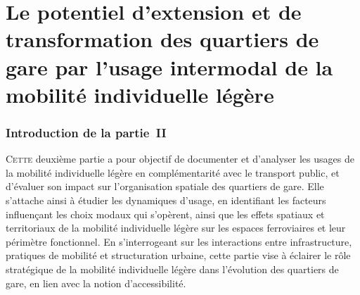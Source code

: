 \part{Le potentiel d’extension et de transformation des quartiers de gare par l'usage intermodal de la mobilité individuelle légère
    \label{part2:titre}
    }

\cleardoublepage
\section*{Introduction de la partie~II
    \label{part2:introduction}
    }

\lettrine[lines=3, findent=8pt, nindent=0pt]{ C}{ette} deuxième partie a pour objectif de documenter et d'analyser les usages de la mobilité individuelle légère en complémentarité avec le transport public, et d'évaluer son impact sur l'organisation spatiale des quartiers de gare. Elle s'attache ainsi à étudier les dynamiques d'usage, en identifiant les facteurs influençant les choix modaux qui s'opèrent, ainsi que les effets spatiaux et territoriaux de la mobilité individuelle légère sur les espaces ferroviaires et leur périmètre fonctionnel. En s'interrogeant sur les interactions entre infrastructure, pratiques de mobilité et structuration urbaine, cette partie vise à éclairer le rôle stratégique de la mobilité individuelle légère dans l'évolution des quartiers de gare, en lien avec la notion d'accessibilité.%

